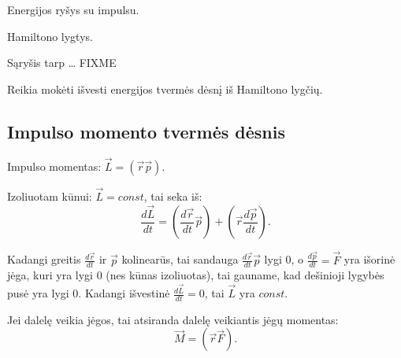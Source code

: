 \begin{remember}
  \item Energijos ryšys su impulsu.
  \item Hamiltono lygtys.
  \item Sąryšis tarp … FIXME
  \item Reikia mokėti išvesti energijos tvermės dėsnį iš Hamiltono
    lygčių.
\end{remember}

\subsection{Impulso momento tvermės dėsnis}

Impulso momentas: $\vec{L} = \left( \vec{r}\vec{p} \right)$.

Izoliuotam kūnui: $\vec{L} = const$, tai seka iš:
\begin{equation*}
  \frac{d\vec{L}}{dt} = \left( \frac{d\vec{r}}{dt} \vec{p} \right) +
  \left( \vec{r} \frac{d\vec{p}}{dt} \right).
\end{equation*}

Kadangi greitis $\frac{d\vec{r}}{dt}$ ir $\vec{p}$ kolinearūs, tai
sandauga $\frac{d\vec{r}}{dt}\vec{p}$ lygi 0,
o $\frac{d\vec{p}}{dt} = \vec{F}$ yra išorinė jėga, kuri yra
lygi 0 (nes kūnas izoliuotas), tai gauname, kad dešinioji
lygybės pusė yra lygi 0. Kadangi išvestinė $\frac{d\vec{L}}{dt} = 0$,
tai $\vec{L}$ yra $const$.

Jei dalelę veikia jėgos, tai atsiranda dalelę veikiantis jėgų
momentas:
\begin{equation*}
  \vec{M} = \left( \vec{r}\vec{F} \right).
\end{equation*}
